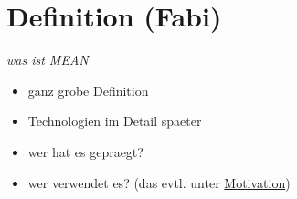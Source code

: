 \section{Definition (Fabi)}
\label{definition-fabi}

\emph{was ist MEAN}

\begin{itemize}
\itemsep1pt\parskip0pt
\item
  ganz grobe Definition
\item
  Technologien im Detail spaeter
\item
  wer hat es gepraegt?
\item
  wer verwendet es? (das evtl. unter \hyperref[motivation]{Motivation})
\end{itemize}
